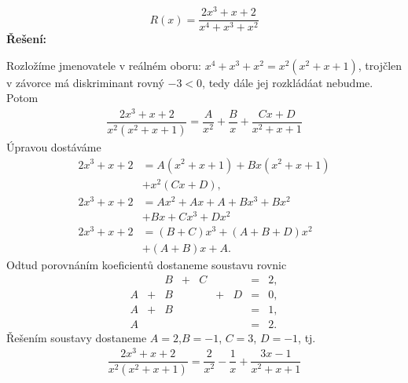 \begin{mdframed}[style=mdexam]
  \begin{example}\label{MAI:exam137}
    \begin{equation*}
      R(x) = \dfrac{2x^3 + x + 2}{x^4 + x^3 + x^2}
    \end{equation*}
    \noindent\textbf{Řešení:}

    Rozložíme jmenovatele v reálném oboru: \(x^4+x^3+x^2 = x^2(x^2 + x + 1)\), trojčlen v závorce
    má diskriminant rovný \(-3<0\), tedy dále jej rozkládáat nebudme. Potom
    \begin{gather*}
      \dfrac{2x^3+x+2}{x^2(x^2+x+1)} = \dfrac{A}{x^2} + \dfrac{B}{x} + \dfrac{Cx+D}{x^2+x+1}
    \end{gather*}
    Úpravou dostáváme
    \begin{align*}
      2x^3+x+2 &= A(x^2+x+1) + Bx(x^2+x+1)     \\ 
               &+ x^2(Cx+D),                   \\
      2x^3+x+2 &= Ax^2 + Ax + A + Bx^3 + Bx^2  \\
               &+ Bx + Cx^3 + Dx^2             \\
      2x^3+x+2 &= (B+C)x^3 + (A+B+D)x^2        \\
               &+ (A+B)x +A.
    \end{align*}
    Odtud porovnáním koeficientů dostaneme soustavu rovnic
    \begin{equation*}
      \begin{array}{rcrcrcrcl}
          & & B &+& C & &   &=& 2,  \\
        A &+& B & &   &+& D &=& 0,  \\
        A &+& B & &   & &   &=& 1,  \\
        A & &   & &   & &   &=& 2.
      \end{array}
    \end{equation*}
    Řešením soustavy dostaneme \(A=2\),\(B = -1\), \(C=3\), \(D=-1\), tj.  
    \begin{gather*}
      \dfrac{2x^3+x+2}{x^2(x^2+x+1)} = \dfrac{2}{x^2} - \dfrac{1}{x} + \dfrac{3x-1}{x^2+x+1}
    \end{gather*}
  \end{example}
\end{mdframed}